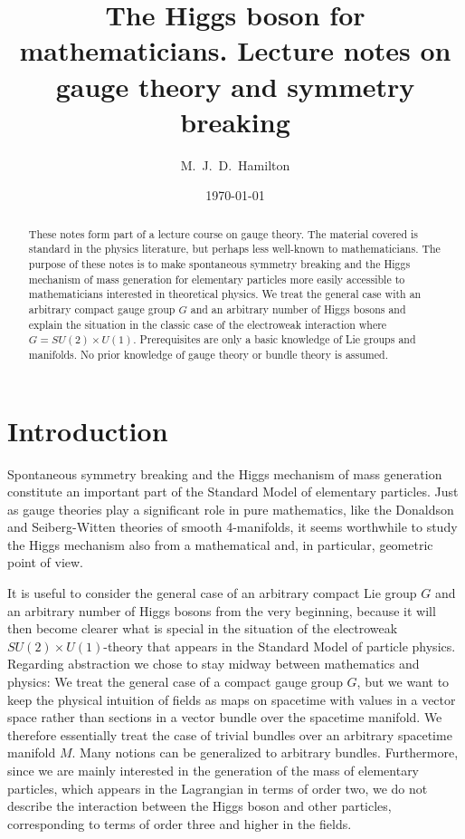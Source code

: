 \documentclass[11pt]{amsart}
\title[The Higgs boson for mathematicians]{The Higgs boson for mathematicians. Lecture notes on gauge theory and symmetry breaking}
\author{M.~J.~D.~Hamilton}
\date{\today}
\theoremstyle{definition}
\theoremstyle{remark}
\numberwithin{equation}{section}
\begin{document}
\begin{abstract}These notes form part of a lecture course on gauge theory. The material covered is standard in the physics literature, but perhaps less well-known to mathematicians. The purpose of these notes is to make spontaneous symmetry breaking and the Higgs mechanism of mass generation for elementary particles more easily accessible to mathematicians interested in theoretical physics. We treat the general case with an arbitrary compact gauge group $G$ and an arbitrary number of Higgs bosons and explain the situation in the classic case of the electroweak interaction where $G=SU(2)\times U(1)$. Prerequisites are only a basic knowledge of Lie groups and manifolds. No prior knowledge of gauge theory or bundle theory is assumed.
\end{abstract}

\maketitle

\section{Introduction}
Spontaneous symmetry breaking and the Higgs mechanism of mass generation constitute an important part of the Standard Model of elementary particles. Just as gauge theories play a significant role in pure mathematics, like the Donaldson and Seiberg-Witten theories of smooth 4-manifolds, it seems worthwhile to study the Higgs mechanism also from a mathematical and, in particular, geometric point of view.

It is useful to consider the general case of an arbitrary compact Lie group $G$ and an arbitrary number of Higgs bosons from the very beginning, because it will then become clearer what is special in the situation of the electroweak $SU(2)\times U(1)$-theory that appears in the Standard Model of particle physics. Regarding abstraction we chose to stay midway between mathematics and physics: We treat the general case of a compact gauge group $G$, but we want to keep the physical intuition of fields as maps on spacetime with values in a vector space rather than sections in a vector bundle over the spacetime manifold. We therefore essentially treat the case of trivial bundles over an arbitrary spacetime manifold $M$. Many notions can be generalized to arbitrary bundles. Furthermore, since we are mainly interested in the generation of the mass of elementary particles, which appears in the Lagrangian in terms of order two, we do not describe the interaction between the Higgs boson and other particles, corresponding to terms of order three and higher in the fields.
\end{document}
